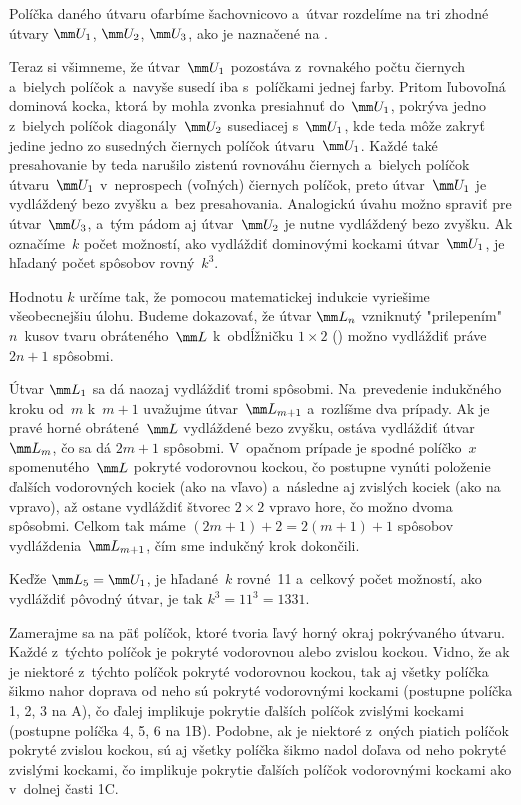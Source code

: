 {%
\obrplus%
Políčka daného útvaru ofarbíme šachovnicovo a~útvar rozdelíme na tri
zhodné útvary $\mm U_1$, $\mm U_2$, $\mm U_3$, ako je naznačené na \obr.
%

Teraz si všimneme, že útvar~$\mm U_1$ pozostáva z~rovnakého počtu čiernych
a~bielych políčok a~navyše susedí iba s~políčkami jednej farby. Pritom ľubovoľná
dominová kocka, ktorá by mohla zvonka presiahnuť do~$\mm U_1$, pokrýva jedno
z~bielych políčok diagonály~$\mm U_2$ susediacej s~$\mm U_1$, kde teda môže
zakryť jedine jedno zo susedných čiernych políčok útvaru~$\mm U_1$. Každé také
presahovanie by teda narušilo zistenú rovnováhu čiernych a~bielych políčok útvaru~$\mm U_1$
v~neprospech (voľných) čiernych políčok, preto útvar~$\mm U_1$ je
vydláždený bezo zvyšku a~bez presahovania. Analogickú úvahu možno spraviť pre
útvar~$\mm U_3$, a~tým pádom aj útvar~$\mm U_2$ je nutne vydláždený
bezo zvyšku. Ak označíme~$k$ počet možností, ako
vydláždiť dominovými kockami útvar~$\mm U_1$, je hľadaný počet spôsobov rovný~$k^3$.

Hodnotu $k$ určíme tak, že pomocou matematickej indukcie vyriešime všeobecnejšiu úlohu.
Budeme dokazovať, že útvar $\mm L_n$ vzniknutý "prilepením"
$n$~kusov tvaru obráteného~$\mm L$ k~obdĺžničku $1 \times 2$ (\obr)
možno vydláždiť práve $2n+1$ spôsobmi.
%

Útvar $\mm L_1$ sa dá naozaj vydláždiť tromi spôsobmi. Na~prevedenie indukčného
kroku od~$m$ k~$m+1$ uvažujme útvar~$\mm L_{m+1}$ a~rozlíšme dva prípady. Ak je pravé horné
obrátené~$\mm L$ vydláždené bezo zvyšku, ostáva vydláždiť útvar~$\mm L_m$, čo
sa dá $2m+1$ spôsobmi. V~opačnom prípade je spodné políčko~$x$ spomenutého~$\mm L$ pokryté
vodorovnou kockou, čo postupne vynúti položenie ďalších vodorovných kociek (ako
na \obr{} vľavo) a~následne aj zvislých kociek (ako na  vpravo),
až ostane vydláždiť štvorec $2\times 2$ vpravo hore, čo možno dvoma
spôsobmi. Celkom tak máme $(2m+1)+2 = 2(m+1)+1$ spôsobov vydláždenia~$\mm L_{m+1}$, čím sme
indukčný krok dokončili.
%

Keďže $\mm L_5 = \mm U_1$, je hľadané~$k$
rovné~11 a~celkový počet možností, ako vydláždiť pôvodný
útvar, je tak $k^3 = 11^3 = 1331$.

\ineres
Zamerajme sa na päť políčok, ktoré tvoria ľavý horný okraj pokrývaného
útvaru. Každé z~týchto políčok je pokryté vodorovnou alebo zvislou
kockou. Vidno, že ak je niektoré z~týchto políčok pokryté vodorovnou
kockou, tak aj všetky políčka šikmo nahor doprava od neho sú pokryté
vodorovnými kockami (postupne políčka 1, 2, 3 na \obr A), čo ďalej
implikuje pokrytie ďalších políčok zvislými kockami (postupne políčka 4, 5, 6
na \obrr1B). Podobne, ak je niektoré z~oných piatich políčok pokryté zvislou
kockou, sú aj všetky políčka šikmo nadol doľava od neho pokryté zvislými
kockami, čo implikuje pokrytie ďalších políčok vodorovnými kockami ako
v~dolnej časti \obrr1C.
%

}
